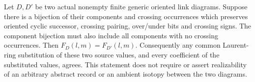 \begin{lemma}
\label{rp:record-polynomial}\leanok
Let $D,D'$ be two actual nonempty finite generic oriented link diagrams.
Suppose there is a bijection of their components and crossing occurrences
which preserves oriented cyclic successor, crossing pairing, over/under
bits and crossing signs. The component bijection must also include all
components with no crossing occurrences. Then $F_D(l,m)=F_{D'}(l,m)$.
Consequently any common Laurent-ring substitution of these two source
values, and every coefficient of the substituted values, agrees.
This statement does not require or assert realizability of an arbitrary
abstract record or an ambient isotopy between the two diagrams.

\end{lemma}
